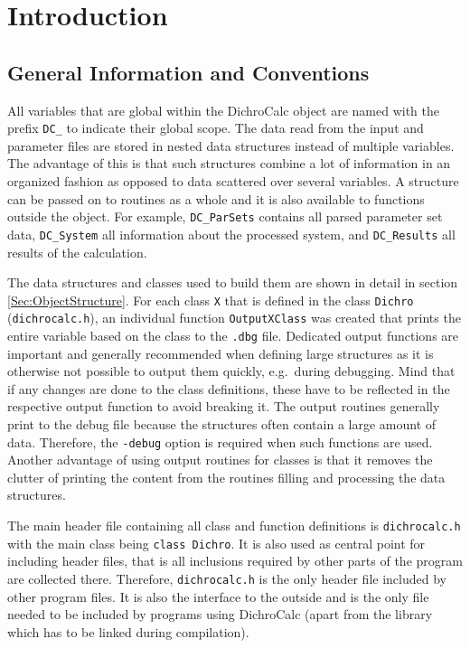 \documentclass[11pt, letterpaper]{article}
\begin{document}


\tableofcontents

\newpage

\section{Introduction}

\subsection{General Information and Conventions}

All variables that are global within the DichroCalc object are named with the prefix \verb'DC_' to indicate their global scope. The data read from the input and parameter files are stored in nested data structures instead of multiple variables. The advantage of this is that such structures combine a lot of information in an organized fashion as opposed to data scattered over several variables. A structure can be passed on to routines as a whole and it is also available to functions outside the object. For example, \verb'DC_ParSets' contains all parsed parameter set data, \verb'DC_System' all information about the processed system, and \verb'DC_Results' all results of the calculation.

The data structures and classes used to build them are shown in detail in section \ref{Sec:ObjectStructure}. For each class \verb'X' that is defined in the class \verb'Dichro' (\verb'dichrocalc.h'), an individual function \verb'OutputXClass' was created that prints the entire variable based on the class to the \verb'.dbg' file. Dedicated output functions are important and generally recommended when defining large structures as it is otherwise not possible to output them quickly, e.g.\ during debugging. Mind that if any changes are done to the class definitions, these have to be reflected in the respective output function to avoid breaking it. The output routines generally print to the debug file because the structures often contain a large amount of data. Therefore, the \verb'-debug' option is required when such functions are used. Another advantage of using output routines for classes is that it removes the clutter of printing the content from the routines filling and processing the data structures.

The main header file containing all class and function definitions is \verb'dichrocalc.h' with the main class being \verb'class Dichro'. It is also used as central point for including header files, that is all inclusions required by other parts of the program are collected there. Therefore, \verb'dichrocalc.h' is the only header file included by other program files. It is also the interface to the outside and is the only file needed to be included by programs using DichroCalc (apart from the library which has to be linked during compilation).
\end{document}
